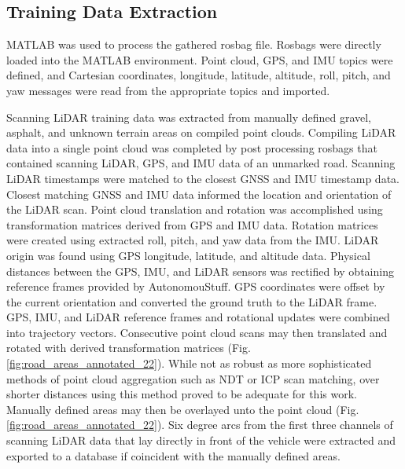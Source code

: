 \documentclass[balance,upint,subscriptcorrection,varvw,mathalfa=cal=boondoxo,colorlinks]{asmeconf}
\begin{document}
	\subsection{Training Data Extraction}
	
	{MATLAB was used to process the gathered rosbag file. Rosbags were directly loaded into the MATLAB environment. Point cloud, GPS, and IMU topics were defined, and Cartesian coordinates, longitude, latitude, altitude, roll, pitch, and yaw messages were read from the appropriate topics and imported. }
	
	{Scanning LiDAR training data was extracted from manually defined gravel, asphalt, and unknown terrain areas on compiled point clouds. Compiling LiDAR data into a single point cloud was completed by post processing rosbags that contained scanning LiDAR, GPS, and IMU data of an unmarked road. Scanning LiDAR timestamps were matched to the closest GNSS and IMU timestamp data. Closest matching GNSS and IMU data informed the location and orientation of the LiDAR scan. Point cloud translation and rotation was accomplished using transformation matrices derived from GPS and IMU data. Rotation matrices were created using extracted roll, pitch, and yaw data from the IMU. LiDAR origin was found using GPS longitude, latitude, and altitude data. Physical distances between the GPS, IMU, and LiDAR sensors was rectified by obtaining reference frames provided by AutonomouStuff. GPS coordinates were offset by the current orientation and converted the ground truth to the LiDAR frame. GPS, IMU, and LiDAR reference frames and rotational updates were combined into trajectory vectors. Consecutive point cloud scans may then translated and rotated with derived transformation matrices (Fig. \ref{fig:road_areas_annotated_22}). While not as robust as more sophisticated methods of point cloud aggregation such as NDT or ICP scan matching, over shorter distances using this method proved to be adequate for this work. Manually defined areas may then be overlayed unto the point cloud (Fig. \ref{fig:road_areas_annotated_22}). Six degree arcs from the first three channels of scanning LiDAR data that lay directly in front of the vehicle were extracted and exported to a database if coincident with the manually defined areas.}
	
\end{document}
